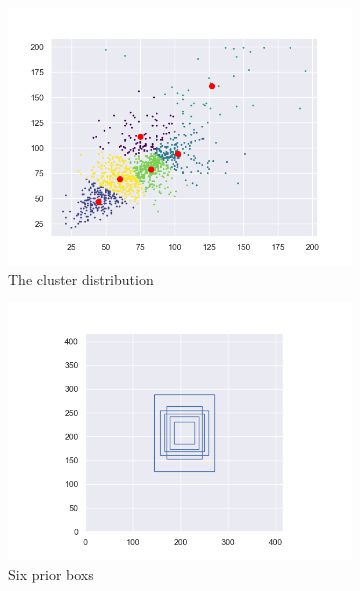 \begin{figure}[h]
	\begin{center}
		\begin{subfigure}[b]{0.49\textwidth}
			\includegraphics[width=\textwidth]{thesis-template-master/images/Figurefor 1480_1.png}
			\caption{ The cluster  distribution }
			\label{fig:res18}
		\end{subfigure}
		\begin{subfigure}[b]{0.49\textwidth}
		    \centering
			\includegraphics[width=\textwidth]{thesis-template-master/images/Figure_for1480.png}
			\caption{ Six prior boxs}
			\label{fig:cellnet}
		\end{subfigure}
		\begin{subfigure}[b]{0.49\textwidth}

\end{subfigure}
\end{center}
\end{figure}
